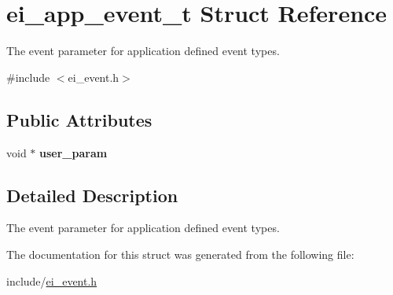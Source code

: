 \hypertarget{structei__app__event__t}{}\section{ei\+\_\+app\+\_\+event\+\_\+t Struct Reference}
\label{structei__app__event__t}


The event parameter for application defined event types.  




{\ttfamily \#include $<$ei\+\_\+event.\+h$>$}

\subsection*{Public Attributes}
\begin{DoxyCompactItemize}
\item 
\mbox{\label{structei__app__event__t_a236a89c3726aa9c770da42ba37ce3d3f}} 
void $\ast$ {\bfseries user\+\_\+param}
\end{DoxyCompactItemize}


\subsection{Detailed Description}
The event parameter for application defined event types. 

The documentation for this struct was generated from the following file\+:\begin{DoxyCompactItemize}
\item 
include/\hyperlink{ei__event_8h}{ei\+\_\+event.\+h}\end{DoxyCompactItemize}
